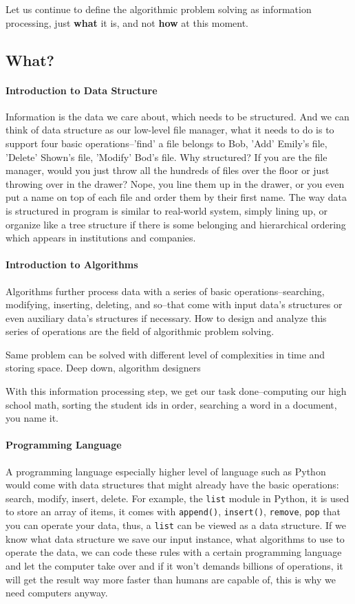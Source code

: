 \documentclass[../main.tex]{subfiles}
\begin{document}
Let us continue to define the  algorithmic problem solving as information processing, just \textbf{what} it is, and not \textbf{how} at this moment.  
\subsection{What?}
\paragraph{Introduction to Data Structure} Information is the data we care about, which needs to be structured. And we can think of data structure as our low-level file manager, what it needs to do is to support four basic operations--'find' a file belongs to Bob, 'Add' Emily's file, 'Delete' Shown's file, 'Modify' Bod's file. Why structured? If you are the file manager, would you just throw all the hundreds of files over the floor or just throwing over in the drawer? Nope, you line them up in the drawer, or you even put a name on top of each file and order them by their first name. The way data is structured in program is similar to real-world system, simply lining up, or organize like a tree structure if there is some belonging and hierarchical ordering which appears in institutions and companies. 


\paragraph{Introduction to Algorithms} Algorithms further process  data with a series of basic operations--searching, modifying, inserting, deleting, and so--that come with input data's structures or even auxiliary data's  structures if  necessary. How to design and analyze this series of operations are the field of algorithmic problem solving. 

Same problem can be solved with different level of complexities in time and storing space. Deep down, algorithm designers 

With this information processing step, we get our task done--computing our high school math, sorting the student ids in order, searching a word in a document, you name it. 

\paragraph{Programming Language} A programming language especially higher level of language such as Python would come with data structures that might already have the basic operations: search, modify, insert, delete. For example, the \texttt{list} module in Python, it is used to store an array of items, it comes with \texttt{append()}, \texttt{insert()}, \texttt{remove}, \texttt{pop} that you can operate your data, thus, a \texttt{list} can be viewed as a data structure. If we know what data structure we save our input instance, what algorithms to use to operate the data, we can code these rules with a certain programming language and let the computer take over and if it won't demands billions of operations, it will get the result way more faster than humans are capable of, this is why we need computers anyway.
\end{document}
